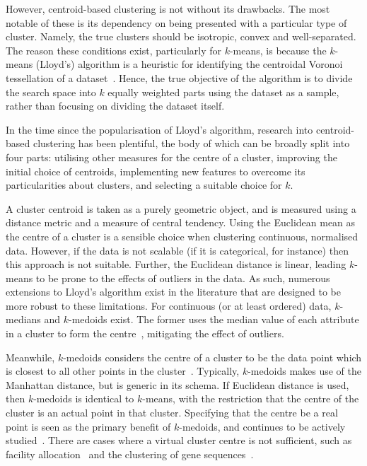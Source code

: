 However, centroid-based clustering is not without its drawbacks. The most
notable of these is its dependency on being presented with a particular type of
cluster. Namely, the true clusters should be isotropic, convex and
well-separated. The reason these conditions exist, particularly for \(k\)-means,
is because the \(k\)-means (Lloyd's) algorithm is a heuristic for identifying
the centroidal Voronoi tessellation of a dataset~\cite{Du2006}. Hence, the true
objective of the algorithm is to divide the search space into \(k\) equally
weighted parts using the dataset as a sample, rather than focusing on dividing
the dataset itself.

In the time since the popularisation of Lloyd's algorithm, research into
centroid-based clustering has been plentiful, the body of which can be broadly
split into four parts: utilising other measures for the centre of a cluster,
improving the initial choice of centroids, implementing new features to
overcome its particularities about clusters, and selecting a suitable choice for
\(k\).

A cluster centroid is taken as a purely geometric object, and is measured using
a distance metric and a measure of central tendency. Using the Euclidean mean as
the centre of a cluster is a sensible choice when clustering continuous,
normalised data. However, if the data is not scalable (if it is categorical, for
instance) then this approach is not suitable. Further, the Euclidean distance is
linear, leading \(k\)-means to be prone to the effects of outliers in the data.
As such, numerous extensions to Lloyd's algorithm exist in the literature that
are designed to be more robust to these limitations. For continuous (or at least
ordered) data, \(k\)-medians and \(k\)-medoids exist. The former uses the median
value of each attribute in a cluster to form the
centre~\cite{Bradley1997,Arya2001}, mitigating the effect of outliers.

Meanwhile, \(k\)-medoids considers the centre of a cluster to be the data point
which is closest to all other points in the cluster~\cite{Kaufman1987}.
Typically, \(k\)-medoids makes use of the Manhattan distance, but is generic in
its schema. If Euclidean distance is used, then \(k\)-medoids is identical to
\(k\)-means, with the restriction that the centre of the cluster is an actual
point in that cluster. Specifying that the centre be a real point is seen as the
primary benefit of \(k\)-medoids, and continues to be actively
studied~\cite{Schubert2019,Ushakov2021}. There are cases where a virtual cluster
centre is not sufficient, such as facility allocation~\cite{Chen2016,Wang2020}
and the clustering of gene sequences~\cite{Johnson2018}.

